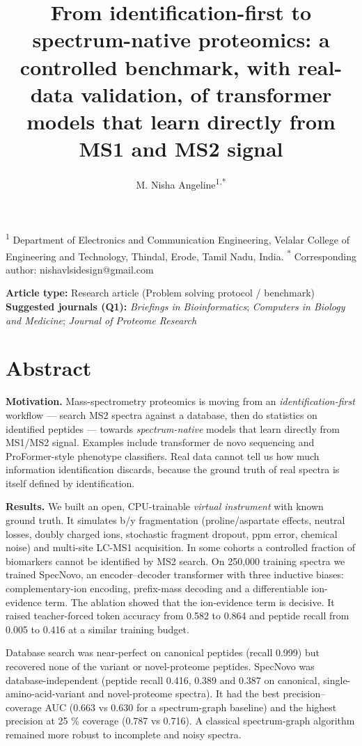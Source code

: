 \documentclass[
]{article}
\title{From identification-first to spectrum-native proteomics: a
controlled benchmark, with real-data validation, of transformer models
that learn directly from MS1 and MS2 signal}
\author{M. Nisha Angeline\textsuperscript{1,*}}
\date{}
\begin{document}
\maketitle

\textsuperscript{1} Department of Electronics and Communication
Engineering, Velalar College of Engineering and Technology, Thindal,
Erode, Tamil Nadu, India. \textsuperscript{*} Corresponding author:
nishavlsidesign@gmail.com

\textbf{Article type:} Research article (Problem solving protocol /
benchmark) \textbf{Suggested journals (Q1):} \emph{Briefings in
Bioinformatics}; \emph{Computers in Biology and Medicine}; \emph{Journal
of Proteome Research}

\hypertarget{abstract}{%
\section{Abstract}\label{abstract}}

\textbf{Motivation.} Mass-spectrometry proteomics is moving from an
\emph{identification-first} workflow --- search MS2 spectra against a
database, then do statistics on identified peptides --- towards
\emph{spectrum-native} models that learn directly from MS1/MS2 signal.
Examples include transformer de novo sequencing and ProFormer-style
phenotype classifiers. Real data cannot tell us how much information
identification discards, because the ground truth of real spectra is
itself defined by identification.

\textbf{Results.} We built an open, CPU-trainable \emph{virtual
instrument} with known ground truth. It simulates b/y fragmentation
(proline/aspartate effects, neutral losses, doubly charged ions,
stochastic fragment dropout, ppm error, chemical noise) and multi-site
LC-MS1 acquisition. In some cohorts a controlled fraction of biomarkers
cannot be identified by MS2 search. On 250,000 training spectra we
trained SpecNovo, an encoder--decoder transformer with three inductive
biases: complementary-ion encoding, prefix-mass decoding and a
differentiable ion-evidence term. The ablation showed that the
ion-evidence term is decisive. It raised teacher-forced token accuracy
from 0.582 to 0.864 and peptide recall from 0.005 to 0.416 at a similar
training budget.

Database search was near-perfect on canonical peptides (recall 0.999)
but recovered none of the variant or novel-proteome peptides. SpecNovo
was database-independent (peptide recall 0.416, 0.389 and 0.387 on
canonical, single-amino-acid-variant and novel-proteome spectra). It had
the best precision--coverage AUC (0.663 vs 0.630 for a spectrum-graph
baseline) and the highest precision at 25 \% coverage (0.787 vs 0.716).
A classical spectrum-graph algorithm remained more robust to incomplete
and noisy spectra.
\end{document}

